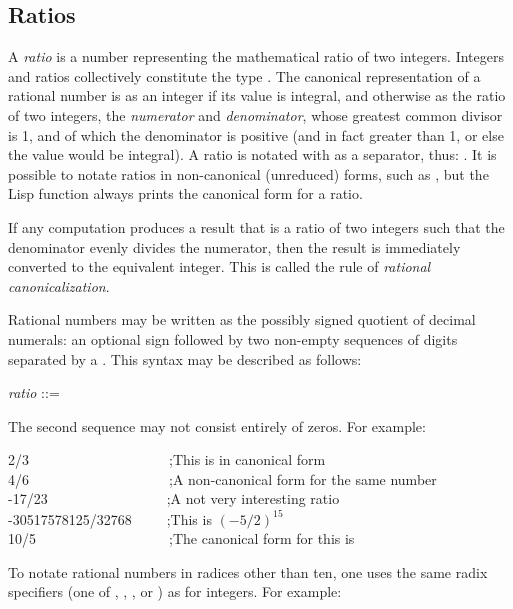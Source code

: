 \subsection{Ratios}

A \emph{ratio} is a number representing the mathematical ratio
of two integers.  Integers and ratios collectively constitute
the type .
The canonical representation of a rational number is as an
integer if its value is integral, and otherwise as the ratio of two
integers, the \emph{numerator} and \emph{denominator}, whose greatest
common divisor is 1, and of which the denominator is positive (and in
fact greater than 1, or else the value would be integral).
A ratio is notated with
\cdf{/} as a separator, thus: .  It is possible to notate
ratios in non-canonical (unreduced) forms, such as , but the
Lisp function  always prints the canonical form for a
ratio.

If any computation produces a result that is a ratio of
two integers such that the denominator evenly divides the
numerator, then the result is immediately converted to the equivalent
integer.  This is called the rule of \emph{rational canonicalization}.

Rational numbers may be written as the possibly signed quotient of
decimal numerals: an optional sign followed by two non-empty sequences of
digits separated by a \cd{/}.  This syntax may be described as
follows:

\begin{tabbing}
\emph{ratio} ::=   \cd{/} 
\end{tabbing}

The second sequence may not consist
entirely of zeros.
For example:
\begin{lisp}
2/3~~~~~~~~~~~~~~~~~~~~;\textrm{This is in canonical form} \\
4/6~~~~~~~~~~~~~~~~~~~~;\textrm{A non-canonical form for the same number} \\
-17/23~~~~~~~~~~~~~~~~~;\textrm{A not very interesting ratio} \\
-30517578125/32768~~~~~;\textrm{This is $(-5/2)^{15}$} \\
10/5~~~~~~~~~~~~~~~~~~~;\textrm{The canonical form for this is }
\end{lisp}

To notate rational numbers in radices other than ten,
one uses the same radix specifiers
(one of , , , or ) as for integers.
For example:

